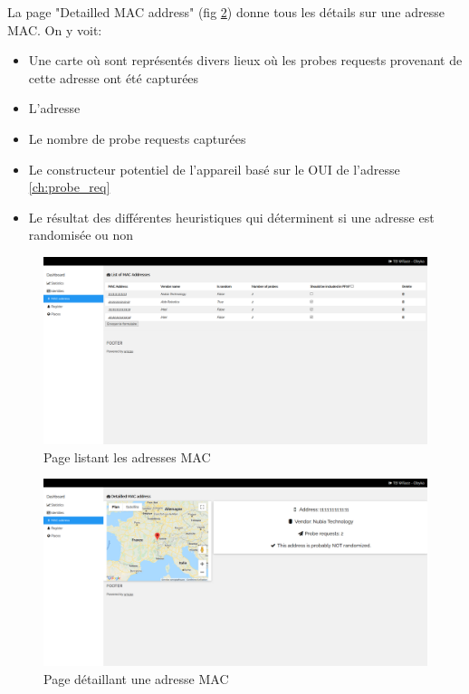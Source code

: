 La page "Detailled MAC address" (fig \ref{fig:dashboard_macs}) donne tous les détails sur une adresse MAC. On y voit:
\begin{itemize}
    \item Une carte où sont représentés divers lieux où les probes requests provenant de cette adresse ont été capturées
    \item L'adresse
    \item Le nombre de probe requests capturées
    \item Le constructeur potentiel de l'appareil basé sur le OUI de l'adresse \ref{ch:probe_req}
    \item Le résultat des différentes heuristiques qui déterminent si une adresse est randomisée ou non
\end{itemize}

\clearpage
\newpage
\thispagestyle{empty}
\begin{landscape}
    \centering
\thispagestyle{empty}
\begin{figure}[h]
	\includegraphics[width=\linewidth]{images/dashboard/macs.png}
	\caption{Page listant les adresses MAC}
	\label{fig:dashboard_list_macs}
\end{figure}
\end{landscape}

\clearpage
\newpage
\thispagestyle{empty}
\begin{landscape}
    \centering
\thispagestyle{empty}
\begin{figure}[h]
	\includegraphics[width=\linewidth]{images/dashboard/detailled_macs.png}
	\caption{Page détaillant une adresse MAC}
	\label{fig:dashboard_macs}
\end{figure}
\end{landscape}

